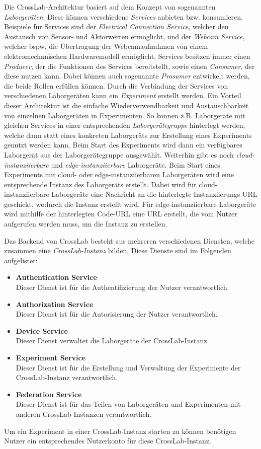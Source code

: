Die CrossLab-Architektur basiert auf dem Konzept von sogenannten \textit{Laborgeräten}. Diese können verschiedene \textit{Services} anbieten bzw. konsumieren. Beispiele für Services sind der \textit{Electrical Connection Service}, welcher den Austausch von Sensor- und Aktorwerten ermöglicht, und der \textit{Webcam Service}, welcher bspw. die Übertragung der Webcamaufnahmen von einem elektromechanischen Hardwaremodell ermöglicht. Services besitzen immer einen \textit{Producer}, der die Funktionen des Services bereitstellt, sowie einen \textit{Consumer}, der diese nutzen kann. Dabei können auch sogenannte \textit{Prosumer} entwickelt werden, die beide Rollen erfüllen können. Durch die Verbindung der Services von verschiedenen Laborgeräten kann ein \textit{Experiment} erstellt werden. Ein Vorteil dieser Architektur ist die einfache Wiederverwendbarkeit und Austauschbarkeit von einzelnen Laborgeräten in Experimenten. So können z.B. Laborgeräte mit gleichen Services in einer entsprechenden \textit{Laborgerätegruppe} hinterlegt werden, welche dann statt eines konkreten Laborgeräts zur Erstellung eines Experiments genutzt werden kann. Beim Start des Experiments wird dann ein verfügbares Laborgerät aus der Laborgerätegruppe ausgewählt. Weiterhin gibt es noch \textit{cloud-instanziierbare} und \textit{edge-instanziierbare} Laborgeräte. Beim Start eines Experiments mit cloud- oder edge-instanziierbaren Laborgeräten wird eine entsprechende Instanz des Laborgeräts erstellt. Dabei wird für cloud-instanziierbare Laborgeräte eine Nachricht an die hinterlegte Instanziierungs-URL geschickt, wodurch die Instanz erstellt wird. Für edge-instanziierbare Laborgeräte wird mithilfe der hinterlegten Code-URL eine URL erstellt, die vom Nutzer aufgerufen werden muss, um die Instanz zu erstellen.

Das Backend von CrossLab besteht aus mehreren verschiedenen Diensten, welche zusammen eine \textit{CrossLab-Instanz} bilden. Diese Dienste sind im Folgenden aufgelistet:
\begin{itemize}
    \item \textbf{Authentication Service} \\ Dieser Dienst ist für die Authentifizierung der Nutzer verantwortlich.
    \item \textbf{Authorization Service} \\ Dieser Dienst ist für die Autorisierung der Nutzer verantwortlich.
    \item \textbf{Device Service} \\ Dieser Dienst verwaltet die Laborgeräte der CrossLab-Instanz.
    \item \textbf{Experiment Service} \\ Dieser Dienst ist für die Erstellung und Verwaltung der Experimente der CrossLab-Instanz verantwortlich.
    \item \textbf{Federation Service} \\ Dieser Dienst ist für das Teilen von Laborgeräten und Experimenten mit anderen CrossLab-Instanzen verantwortlich.
\end{itemize}
Um ein Experiment in einer CrossLab-Instanz starten zu können benötigen Nutzer ein entsprechendes Nutzerkonto für diese CrossLab-Instanz.